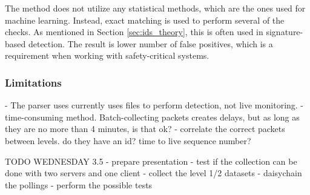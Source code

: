 The method does not utilize any statistical methods, which are
the ones used for machine learning. Instead, exact matching is used to 
perform several of the checks. As mentioned in Section \ref{sec:ids_theory}, this
is often used in signature-based detection. The result is lower number of false positives, 
which is a requirement when working with safety-critical systems. 

\subsubsection{Limitations}

- The parser uses currently uses files to perform detection, not live monitoring.
- time-consuming method. Batch-collecting packets creates delays, 
    but as long as they are no more than 4 minutes, is that ok?
- correlate the correct packets between levels. do they have an id? time to live 
    sequence number?

TODO WEDNESDAY 3.5
- prepare presentation
- test if the collection can be done with two servers and one client
- collect the level 1/2 datasets - daisychain the pollings
- perform the possible tests
